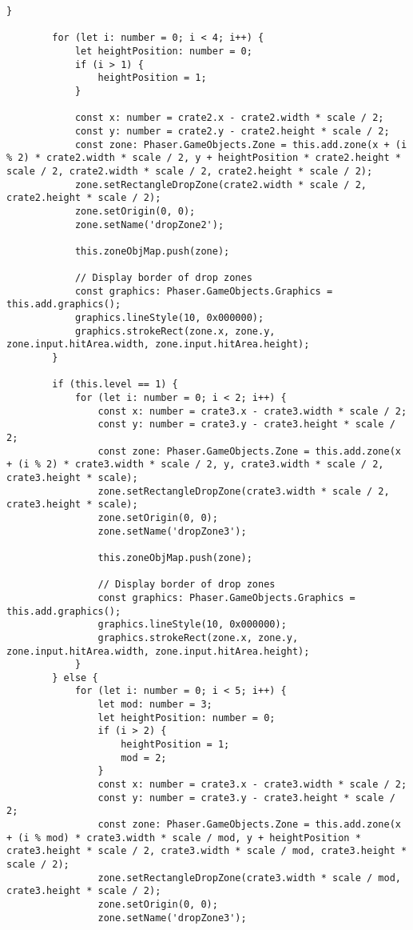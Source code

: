 \begin{lstlisting}[style=TypeScript, caption={restrictedSortingScene.ts}]
        }

        for (let i: number = 0; i < 4; i++) {
            let heightPosition: number = 0;
            if (i > 1) {
                heightPosition = 1;
            }

            const x: number = crate2.x - crate2.width * scale / 2;
            const y: number = crate2.y - crate2.height * scale / 2;
            const zone: Phaser.GameObjects.Zone = this.add.zone(x + (i % 2) * crate2.width * scale / 2, y + heightPosition * crate2.height * scale / 2, crate2.width * scale / 2, crate2.height * scale / 2);
            zone.setRectangleDropZone(crate2.width * scale / 2, crate2.height * scale / 2);
            zone.setOrigin(0, 0);
            zone.setName('dropZone2');

            this.zoneObjMap.push(zone);

            // Display border of drop zones
            const graphics: Phaser.GameObjects.Graphics = this.add.graphics();
            graphics.lineStyle(10, 0x000000);
            graphics.strokeRect(zone.x, zone.y, zone.input.hitArea.width, zone.input.hitArea.height);
        }

        if (this.level == 1) {
            for (let i: number = 0; i < 2; i++) {
                const x: number = crate3.x - crate3.width * scale / 2;
                const y: number = crate3.y - crate3.height * scale / 2;
                const zone: Phaser.GameObjects.Zone = this.add.zone(x + (i % 2) * crate3.width * scale / 2, y, crate3.width * scale / 2, crate3.height * scale);
                zone.setRectangleDropZone(crate3.width * scale / 2, crate3.height * scale);
                zone.setOrigin(0, 0);
                zone.setName('dropZone3');

                this.zoneObjMap.push(zone);

                // Display border of drop zones
                const graphics: Phaser.GameObjects.Graphics = this.add.graphics();
                graphics.lineStyle(10, 0x000000);
                graphics.strokeRect(zone.x, zone.y, zone.input.hitArea.width, zone.input.hitArea.height);
            }
        } else {
            for (let i: number = 0; i < 5; i++) {
                let mod: number = 3;
                let heightPosition: number = 0;
                if (i > 2) {
                    heightPosition = 1;
                    mod = 2;
                }
                const x: number = crate3.x - crate3.width * scale / 2;
                const y: number = crate3.y - crate3.height * scale / 2;
                const zone: Phaser.GameObjects.Zone = this.add.zone(x + (i % mod) * crate3.width * scale / mod, y + heightPosition * crate3.height * scale / 2, crate3.width * scale / mod, crate3.height * scale / 2);
                zone.setRectangleDropZone(crate3.width * scale / mod, crate3.height * scale / 2);
                zone.setOrigin(0, 0);
                zone.setName('dropZone3');


\end{lstlisting}
